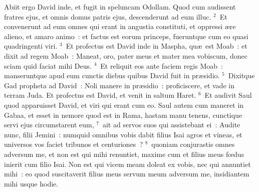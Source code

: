 \lettrine[lines=10,image=true,loversize=0.05,lraise=-0.03]{A}{}biit ergo David inde, et fugit in speluncam Odollam. Quod cum audissent fratres ejus, et omnis domus patris ejus, descenderunt ad eum illuc.
${}^{2}$~Et convenerunt ad eum omnes qui erant in angustia constituti, et oppressi \ae re alieno, et amaro animo~: et factus est eorum princeps, fueruntque cum eo quasi quadringenti viri.
${}^{3}$~Et profectus est David inde in Maspha, qu\ae\ est Moab~: et dixit ad regem Moab~: Maneat, oro, pater meus et mater mea vobiscum, donec sciam quid faciat mihi Deus.
${}^{4}$~Et reliquit eos ante faciem regis Moab~: manseruntque apud eum cunctis diebus quibus David fuit in pr\ae sidio.
${}^{5}$~Dixitque Gad propheta ad David~: Noli manere in pr\ae sidio~: proficiscere, et vade in terram Juda. Et profectus est David, et venit in saltum Haret.
${}^{6}$~Et audivit Saul quod apparuisset David, et viri qui erant cum eo. Saul autem cum maneret in Gabaa, et esset in nemore quod est in Rama, hastam manu tenens, cunctique servi ejus circumstarent eum,
${}^{7}$~ait ad servos suos qui assistebant ei~: Audite nunc, filii Jemini~: numquid omnibus vobis dabit filius Isai agros et vineas, et universos vos faciet tribunos et centuriones~?
${}^{8}$~quoniam conjurastis omnes adversum me, et non est qui mihi renuntiet, maxime cum et filius meus fœdus inierit cum filio Isai. Non est qui vicem meam doleat ex vobis, nec qui annuntiet mihi~: eo quod suscitaverit filius meus servum meum adversum me, insidiantem mihi usque hodie.


